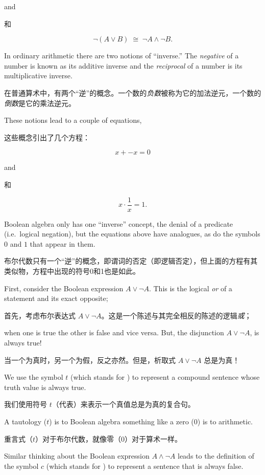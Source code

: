 \noindent and

\noindent 和

\[ {\lnot}(A \lor B) \; \cong \; {\lnot}A \land {\lnot}B. \]

In ordinary arithmetic there are two notions of ``inverse.''  The 
{\em negative} of a number is known as its additive inverse and
the {\em reciprocal} of a number is its multiplicative inverse.

在普通算术中，有两个“逆”的概念。一个数的{\em 负数}被称为它的加法逆元，一个数的{\em 倒数}是它的乘法逆元。

These notions lead to a couple of equations,

这些概念引出了几个方程：

\[ x + -x = 0 \]

\noindent and

\noindent 和

\[ x \cdot \frac{1}{x} = 1. \]

\noindent Boolean algebra only has one ``inverse'' concept, the denial
 of a predicate (i.e.\ logical negation), but the equations above have analogues, as do
the symbols $0$ and $1$ that appear in them.

\noindent 布尔代数只有一个“逆”的概念，即谓词的否定（即逻辑否定），但上面的方程有其类似物，方程中出现的符号0和1也是如此。

First, consider
the Boolean expression $A \lor {\lnot}A$.  This is the logical {\em or}
of a statement and its exact opposite;

首先，考虑布尔表达式 $A \lor {\lnot}A$。这是一个陈述与其完全相反的陈述的逻辑{\em 或}；

when one is true the other is 
false and vice versa.  But, the disjunction $A \lor {\lnot}A$, is 
always true!

当一个为真时，另一个为假，反之亦然。但是，析取式 $A \lor {\lnot}A$ 总是为真！

We use the symbol $t$ (which stands for 
)
to represent a compound sentence whose truth value is always true.

我们使用符号 $t$（代表）来表示一个真值总是为真的复合句。

A tautology ($t$) is to Boolean algebra something like a zero ($0$)
is to arithmetic.

重言式（$t$）对于布尔代数，就像零（$0$）对于算术一样。

Similar thinking about the Boolean expression
  $A \land {\lnot}A$ leads to the definition of the symbol $c$ (which
stands for ) to 
represent a sentence that is always
false.

